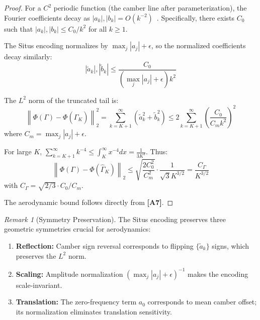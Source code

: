 \documentclass[11pt,a4paper]{article}
\theoremstyle{definition}
\theoremstyle{remark}
\newtheorem{remark}[theorem]{Remark}
\newcommand{\assumptionTag}[1]{\textsf{\textbf{[A#1]}}}
\newcommand{\norm}[1]{\left\lVert#1\right\rVert}
\begin{document}
\begin{proof}
For a $C^2$ periodic function (the camber line after parameterization), the Fourier coefficients decay as $|a_k|, |b_k| = O(k^{-2})$~\citep{katznelson2004introduction}.
Specifically, there exists $C_0$ such that $|a_k|, |b_k| \leq C_0/k^2$ for all $k \geq 1$.

The Situs encoding normalizes by $\max_j |a_j| + \epsilon$, so the normalized coefficients decay similarly:
\begin{equation}
|\tilde{a}_k|, |\tilde{b}_k| \leq \frac{C_0}{(\max_j |a_j| + \epsilon) k^2}
\end{equation}

The $L^2$ norm of the truncated tail is:
\begin{equation}
\norm{\Phi(\Gamma) - \Phi(\hat{\Gamma}_K)}_2^2 = \sum_{k=K+1}^{\infty} (\tilde{a}_k^2 + \tilde{b}_k^2) \leq 2 \sum_{k=K+1}^{\infty} \left(\frac{C_0}{C_m k^2}\right)^2
\end{equation}
where $C_m = \max_j |a_j| + \epsilon$.

For large $K$, $\sum_{k=K+1}^{\infty} k^{-4} \leq \int_K^{\infty} x^{-4} dx = \frac{1}{3K^3}$.
Thus:
\begin{equation}
\norm{\Phi(\Gamma) - \Phi(\hat{\Gamma}_K)}_2 \leq \sqrt{\frac{2 C_0^2}{C_m^2}} \cdot \frac{1}{\sqrt{3} K^{3/2}} = \frac{C_\Gamma}{K^{3/2}}
\label{eq:bound_final}
\end{equation}
with $C_\Gamma = \sqrt{2/3} \cdot C_0 / C_m$.

The aerodynamic bound follows directly from \assumptionTag{7}.
\end{proof}

\begin{remark}[Symmetry Preservation]
\label{rem:symmetry}
The Situs encoding preserves three geometric symmetries crucial for aerodynamics:
\begin{enumerate}[label=(\roman*)]
    \item \textbf{Reflection:} Camber sign reversal corresponds to flipping $\{\tilde{a}_k\}$ signs, which preserves the $L^2$ norm.
    \item \textbf{Scaling:} Amplitude normalization $(\max_j |a_j| + \epsilon)^{-1}$ makes the encoding scale-invariant.
    \item \textbf{Translation:} The zero-frequency term $a_0$ corresponds to mean camber offset; its normalization eliminates translation sensitivity.
\end{enumerate}
\end{remark}
\end{document}

